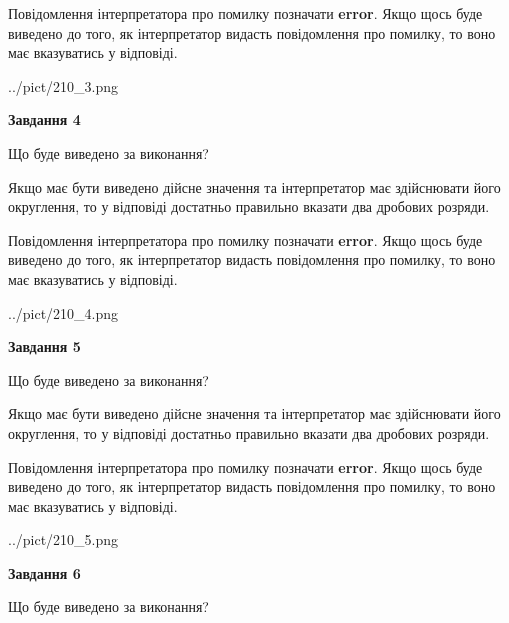 \documentclass[12pt, ukrainian]{article}
\begin{document}
{\begin {Large}
Повідомлення інтерпретатора про помилку позначати \textbf{error}.
Якщо щось буде виведено до того, як інтерпретатор видасть повідомлення про помилку, 
то воно має вказуватись у відповіді. \par

\begin{center}
	{../pict/210_3.png}
\end{center}
\newpage

{\begin {center}\textbf{Завдання 4}\end {center}}\par
Що буде виведено за виконання? \par

Якщо має бути виведено дійсне значення та інтерпретатор має здійснювати його округлення, 
то у відповіді достатньо правильно вказати два дробових розряди.

Повідомлення інтерпретатора про помилку позначати \textbf{error}.
Якщо щось буде виведено до того, як інтерпретатор видасть повідомлення про помилку, 
то воно має вказуватись у відповіді. \par

\begin{center}
	{../pict/210_4.png}
\end{center}
\newpage

{\begin {center}\textbf{Завдання 5}\end {center}}\par
Що буде виведено за виконання? \par

Якщо має бути виведено дійсне значення та інтерпретатор має здійснювати його округлення, 
то у відповіді достатньо правильно вказати два дробових розряди.

Повідомлення інтерпретатора про помилку позначати \textbf{error}.
Якщо щось буде виведено до того, як інтерпретатор видасть повідомлення про помилку, 
то воно має вказуватись у відповіді. \par

\begin{center}
	{../pict/210_5.png}
\end{center}
\newpage

{\begin {center}\textbf{Завдання 6}\end {center}}\par
Що буде виведено за виконання? \par


\end{Large}}
\end{document}
